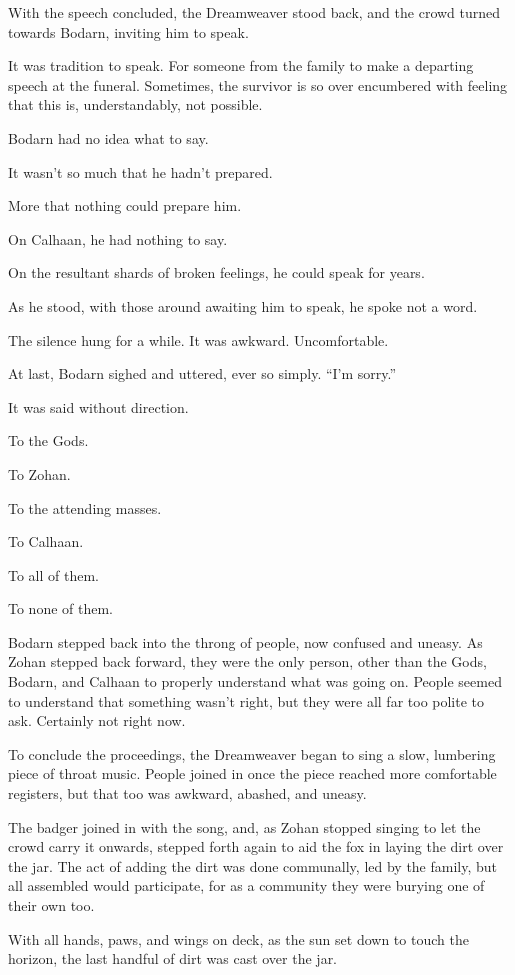 With the speech concluded, the Dreamweaver stood back, and the crowd turned towards Bodarn, inviting him to speak.

It was tradition to speak. For someone from the family to make a departing speech at the funeral. Sometimes, the survivor is so over encumbered with feeling that this is, understandably, not possible.

Bodarn had no idea what to say.

It wasn't so much that he hadn't prepared.

More that nothing could prepare him.

On Calhaan, he had nothing to say.

On the resultant shards of broken feelings, he could speak for years.

As he stood, with those around awaiting him to speak, he spoke not a word.

The silence hung for a while. It was awkward. Uncomfortable.

At last, Bodarn sighed and uttered, ever so simply. ``I'm sorry.''

It was said without direction.

To the Gods.

To Zohan.

To the attending masses.

To Calhaan.

To all of them.

To none of them.

Bodarn stepped back into the throng of people, now confused and uneasy. As Zohan stepped back forward, they were the only person, other than the Gods, Bodarn, and Calhaan to properly understand what was going on. People seemed to understand that something wasn't right, but they were all far too polite to ask. Certainly not right now.

To conclude the proceedings, the Dreamweaver began to sing a slow, lumbering piece of throat music. People joined in once the piece reached more comfortable registers, but that too was awkward, abashed, and uneasy.

The badger joined in with the song, and, as Zohan stopped singing to let the crowd carry it onwards, stepped forth again to aid the fox in laying the dirt over the jar. The act of adding the dirt was done communally, led by the family, but all assembled would participate, for as a community they were burying one of their own too.

With all hands, paws, and wings on deck, as the sun set down to touch the horizon, the last handful of dirt was cast over the jar.

